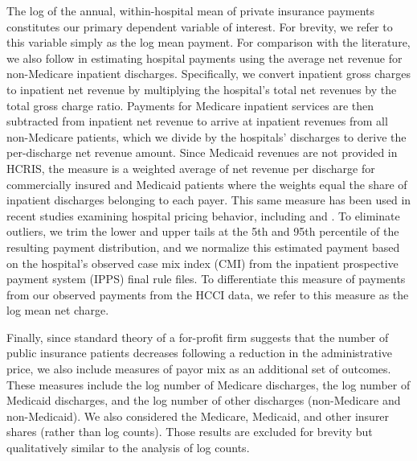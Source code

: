 \documentclass[12pt]{article}
\begin{document}
The log of the annual, within-hospital mean of private insurance payments constitutes our primary dependent variable of interest. For brevity, we refer to this variable simply as the log mean payment. For comparison with the literature, we also follow \cite{dafny2009} in estimating hospital payments using the average net revenue for non-Medicare inpatient discharges. Specifically, we convert inpatient gross charges to inpatient net revenue by multiplying the hospital's total net revenues by the total gross charge ratio. Payments for Medicare inpatient services are then subtracted from inpatient net revenue to arrive at inpatient revenues from all non-Medicare patients, which we divide by the hospitals' discharges to derive the per-discharge net revenue amount. Since Medicaid revenues are not provided in HCRIS, the measure is a weighted average of net revenue per discharge for commercially insured and Medicaid patients where the weights equal the share of inpatient discharges belonging to each payer. This same measure has been used in recent studies examining hospital pricing behavior, including \cite{schmitt2017} and \cite{lewis2015}. To eliminate outliers, we trim the lower and upper tails at the 5th and 95th percentile of the resulting payment distribution, and we normalize this estimated payment based on the hospital's observed case mix index (CMI) from the inpatient prospective payment system (IPPS) final rule files. To differentiate this measure of payments from our observed payments from the HCCI data, we refer to this measure as the log mean net charge.

Finally, since standard theory of a for-profit firm suggests that the number of public insurance patients decreases following a reduction in the administrative price, we also include measures of payor mix as an additional set of outcomes. These measures include the log number of Medicare discharges, the log number of Medicaid discharges, and the log number of other discharges (non-Medicare and non-Medicaid). We also considered the Medicare, Medicaid, and other insurer shares (rather than log counts). Those results are excluded for brevity but qualitatively similar to the analysis of log counts.
\end{document}
